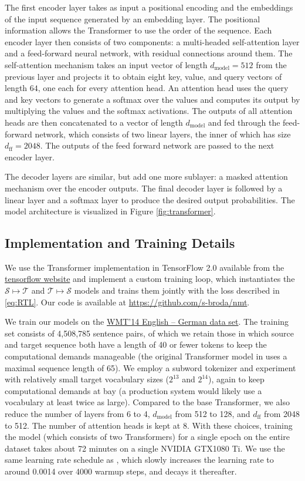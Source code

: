 \documentclass[10pt,a4paper]{article}
\begin{document}
The first encoder layer takes as input a positional encoding and the embeddings of the input sequence generated by an embedding layer. The positional information allows the Transformer to use the order of the sequence. Each encoder layer then consists of two components: a multi-headed self-attention layer and a feed-forward neural network, with residual connections around them. The self-attention mechanism takes an input vector of length $d_{\text{model}} = 512$ from the previous layer and projects it to obtain eight key, value, and query vectors of length $64$, one each for every attention head. An attention head uses the query and key vectors to generate a softmax over the values and computes its output by multiplying the values and the softmax activations. The outputs of all attention heads are then concatenated to a vector of length $d_{\text{model}}$ and fed through the feed-forward network, which consists of two linear layers, the inner of which has size $d_{\text{ff}} = 2048$. The outputs of the feed forward network are passed to the next encoder layer.


The decoder layers are similar, but add one more sublayer: a masked attention mechanism over the encoder outputs. The final decoder layer is followed by a linear layer and a softmax layer to produce the desired output probabilities. The model architecture is visualized in Figure \ref{fig:transformer}.

\subsection{Implementation and Training Details}
We use the Transformer implementation in TensorFlow 2.0 available from the \href{https://www.tensorflow.org/tutorials/text/transformer}{tensorflow website} and implement a custom training loop, which instantiates the $\mathcal{S}\mapsto\mathcal{T}$ and $\mathcal{T}\mapsto\mathcal{S}$ models and trains them jointly with the loss described in \eqref{eq:RTL}. Our code is available at \href{https://github.com/s-broda/nmt}{https://github.com/s-broda/nmt}. 

We train our models on the \href{https://nlp.stanford.edu/projects/nmt/}{WMT'14 English -- German data set}. The training set consists of 4,508,785 sentence pairs, of which we retain those in which source and target sequence both have a length of 40 or fewer tokens to keep the computational demands manageable (the original Transformer model in \citet{transformer} uses a maximal sequence length of 65). We employ a subword tokenizer and experiment with relatively small target vocabulary sizes ($2^{13}$ and $2^{14}$), again to keep computational demands at bay (a production system would likely use a vocabulary at least twice as large). Compared to the base Transformer, we also reduce the number of layers from 6 to 4, $d_{\text{model}}$ from 512 to 128, and $d_{\text{ff}}$ from 2048 to 512. The number of attention heads is kept at 8.
With these choices, training the model (which consists of two Transformers) for a single epoch on the entire dataset takes about 72 minutes on a single NVIDIA GTX1080 Ti. We use the same learning rate schedule as \cite{transformer}, which slowly increases the learning rate to around 0.0014 over 4000 warmup steps, and decays it thereafter.
\end{document}
